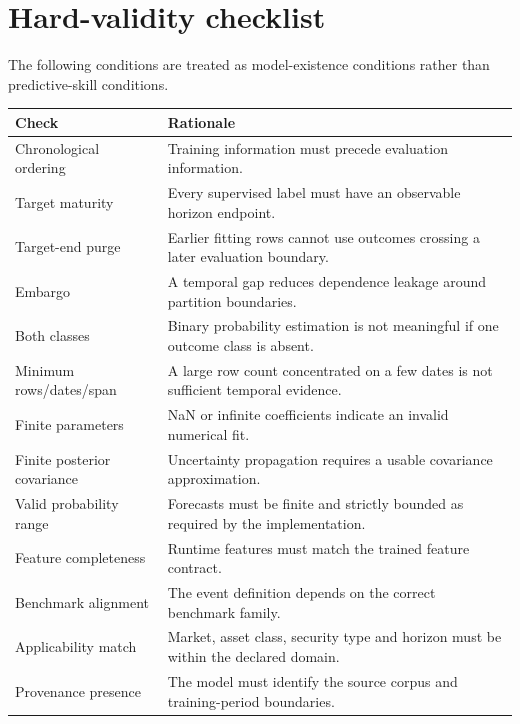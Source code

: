 \documentclass[11pt]{article}
\begin{document}
\section{Hard-validity checklist}
The following conditions are treated as model-existence conditions rather than predictive-skill conditions.
\begin{longtable}{p{}p{}}
\toprule
Check & Rationale\\
\midrule
\endhead
Chronological ordering & Training information must precede evaluation information.\\
Target maturity & Every supervised label must have an observable horizon endpoint.\\
Target-end purge & Earlier fitting rows cannot use outcomes crossing a later evaluation boundary.\\
Embargo & A temporal gap reduces dependence leakage around partition boundaries.\\
Both classes & Binary probability estimation is not meaningful if one outcome class is absent.\\
Minimum rows/dates/span & A large row count concentrated on a few dates is not sufficient temporal evidence.\\
Finite parameters & NaN or infinite coefficients indicate an invalid numerical fit.\\
Finite posterior covariance & Uncertainty propagation requires a usable covariance approximation.\\
Valid probability range & Forecasts must be finite and strictly bounded as required by the implementation.\\
Feature completeness & Runtime features must match the trained feature contract.\\
Benchmark alignment & The event definition depends on the correct benchmark family.\\
Applicability match & Market, asset class, security type and horizon must be within the declared domain.\\
Provenance presence & The model must identify the source corpus and training-period boundaries.\\
\bottomrule
\end{longtable}
\end{document}
